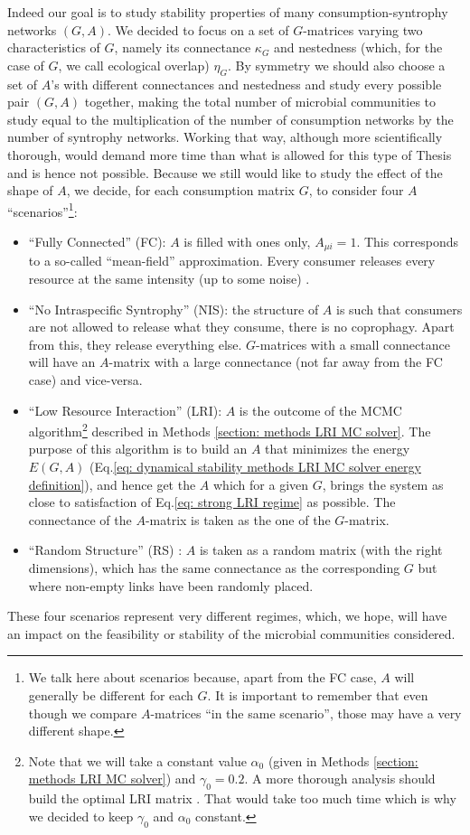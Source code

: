 \documentclass[12pt]{report}
\begin{document}
Indeed our goal is to study stability properties of many consumption-syntrophy networks $(G,A)$. We decided to focus on a set of $G$-matrices varying two characteristics of $G$, namely its connectance $\kappa_G$ and nestedness (which, for the case of $G$, we call ecological overlap) $\eta_G$. By symmetry we should also choose a set of $A$'s with different connectances and nestedness and study every possible pair $(G,A)$ together, making the total number of microbial communities to study equal to the multiplication of the number of consumption networks by the number of syntrophy networks. Working that way, although more scientifically thorough, would demand more time than what is allowed for this type of Thesis and is hence not possible. Because we still would like to study the effect of the shape of $A$, we decide, for each consumption matrix $G$, to consider four $A$ ``scenarios''\footnote{We talk here about scenarios because, apart from the FC case, $A$ will generally be different for each $G$. It is important to remember that even though we compare $A$-matrices ``in the same scenario'', those may have a very different shape.}:
\begin{itemize}
  \item ``Fully Connected'' (FC): $A$ is filled with ones only, $A_{\mu i}=1$. This corresponds to a so-called ``mean-field'' approximation. Every consumer releases every resource at the same intensity (up to some noise) .
  \item ``No Intraspecific Syntrophy'' (NIS): the structure of $A$ is such that consumers are not allowed to release what they consume, \ie there is no coprophagy. Apart from this, they release everything else. $G$-matrices with a small connectance will have an $A$-matrix with a large connectance (not far away from the FC case) and vice-versa.
  \item ``Low Resource Interaction'' (LRI): $A$ is the outcome of the MCMC algorithm\footnote{Note that we will take a constant value $\alpha_0$ (given in Methods \ref{section: methods LRI MC solver}) and $\gamma_0=0.2$. A more thorough analysis should build the optimal LRI matrix . That would take too much time which is why we decided to keep $\gamma_0$ and $\alpha_0$ constant.}
 described in Methods \ref{section: methods LRI MC solver}. The purpose of this algorithm is to build an $A$ that minimizes the energy $E(G,A)$ (Eq.\ref{eq: dynamical stability methods LRI MC solver energy definition}), and hence get the $A$ which for a given $G$, brings the system as close to satisfaction of Eq.\eqref{eq: strong LRI regime} as possible. The connectance of the $A$-matrix is taken as the one of the $G$-matrix.
 \item ``Random Structure'' (RS) : $A$ is taken as a random matrix (with the right dimensions), which has the same connectance as the corresponding $G$ but where non-empty links have been randomly placed.
 \end{itemize}
These four scenarios represent very different regimes, which, we hope, will have an impact on the feasibility or stability of the microbial communities considered.
\end{document}
